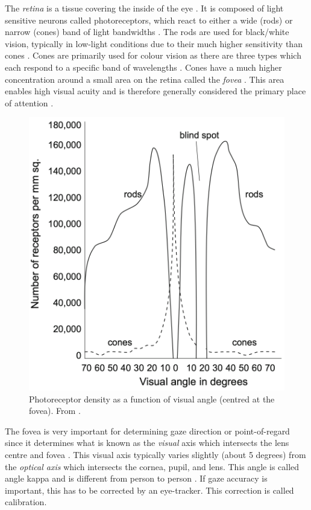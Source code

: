 The \emph{retina} is a tissue covering the inside of the eye \parencite[18]{methodology}. It is composed of light sensitive neurons called photoreceptors, which react to either a wide (rods) or narrow (cones) band of light bandwidths \parencite[18]{methodology}. The rods are used for black/white vision, typically in low-light conditions due to their much higher sensitivity than cones \parencite[18]{methodology}. Cones are primarily used for colour vision as there are three types which each respond to a specific band of wavelengths \parencite[18]{methodology}. Cones have a much higher concentration around a small area on the retina called the \emph{fovea} \parencite[30]{methodology}. This area enables high visual acuity and is therefore generally considered the primary place of attention \parencite[30]{methodology}. %

\begin{figure}
    \centering
    \includegraphics[width=0.6\linewidth]{figures/retina-density.png}
    \caption{Photoreceptor density as a function of visual angle (centred at the fovea). From \parencite{methodology}.}
    \label{fig:my_label}
\end{figure}

The fovea is very important for determining gaze direction or point-of-regard since it determines what is known as the \emph{visual} axis which intersects the lens centre and fovea \parencite[19]{methodology}. This visual axis typically varies slightly (about 5 degrees) from the \emph{optical axis} which intersects the cornea, pupil, and lens. This angle is called angle kappa and is different from person to person \parencite[30]{methodology}. If gaze accuracy is important, this has to be corrected by an eye-tracker. This correction is called calibration.


